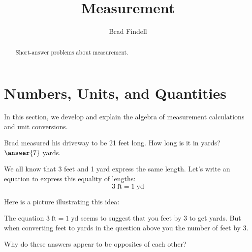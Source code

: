 \documentclass[nooutcomes]{ximera}
\title{Measurement}
\author{Brad Findell}
\begin{document}
\begin{abstract}
Short-answer problems about measurement. 
\end{abstract}
\maketitle




\section{Numbers, Units, and Quantities}
In this section, we develop and explain the algebra of measurement calculations and unit conversions. 

\begin{question}
Brad measured his driveway to be 21 feet long.  How long is it in yards?  
$\answer{7}$ yards.  
\end{question}

We all know that 3 feet and 1 yard express the same length.  Let's write an equation to express this equality of lengths: 
\[
3\;\textrm{ft} = 1\;\textrm{yd}
\]

Here is a picture illustrating this idea:  

\begin{image}
\end{image}

\begin{question}
The equation $3\;\textrm{ft} = 1\;\textrm{yd}$ seems to suggest that you  feet by 3 to get yards.  But when converting feet to yards in the question above you  the number of feet by 3.  

Why do these answers appear to be opposites of each other?  
\end{question}
\end{document}
